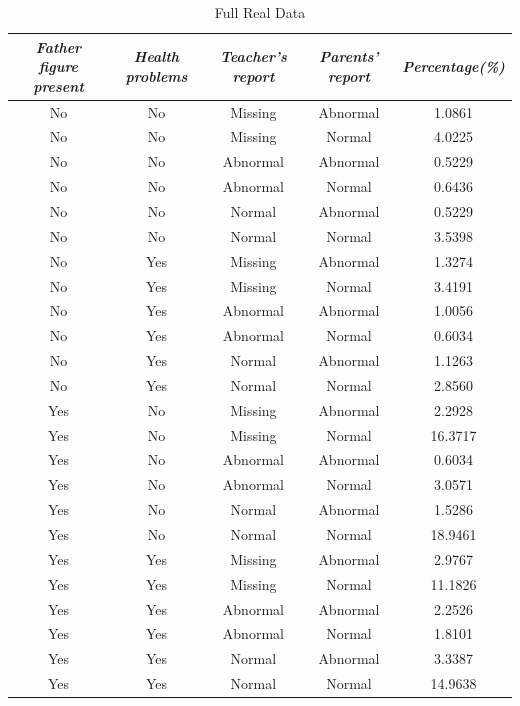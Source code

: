 \documentclass[11pt]{article}
\begin{document}
\begin{table}[t]
    \centering
    \caption{Full Real Data}
    \vspace{0.8cm}
    \begin{tabular}{ccccc}
     \toprule
     \textit{Father figure present} & \textit{Health problems} & \textit{Teacher's report} &  \textit{Parents' report} & \textit{Percentage(\%)} \\
     \midrule
     No & No & Missing  & Abnormal & 1.0861 \\
     No & No & Missing  & Normal & 4.0225 \\
     No & No & Abnormal  & Abnormal & 0.5229 \\
     No & No & Abnormal  & Normal & 0.6436 \\
     No & No & Normal  & Abnormal & 0.5229 \\
     No & No & Normal  & Normal & 3.5398 \\
     No & Yes & Missing  & Abnormal & 1.3274 \\ 
     No & Yes & Missing  & Normal & 3.4191  \\
     No & Yes & Abnormal  & Abnormal & 1.0056 \\
     No & Yes & Abnormal  & Normal & 0.6034 \\
     No & Yes & Normal  & Abnormal & 1.1263 \\
     No & Yes & Normal  & Normal & 2.8560 \\
     Yes & No & Missing  & Abnormal & 2.2928 \\
     Yes & No & Missing  & Normal & 16.3717 \\
     Yes & No & Abnormal  & Abnormal & 0.6034 \\
     Yes & No & Abnormal  & Normal & 3.0571 \\
     Yes & No & Normal  & Abnormal & 1.5286 \\
     Yes & No & Normal  & Normal & 18.9461 \\
     Yes & Yes & Missing  & Abnormal & 2.9767 \\
     Yes & Yes & Missing  & Normal & 11.1826 \\
     Yes & Yes & Abnormal  & Abnormal & 2.2526 \\
     Yes & Yes & Abnormal  & Normal & 1.8101 \\
     Yes & Yes & Normal  & Abnormal & 3.3387 \\
     Yes & Yes & Normal  & Normal & 14.9638 \\
     \bottomrule
    \end{tabular}

    \label{full_real_data}
\end{table}
\end{document}
